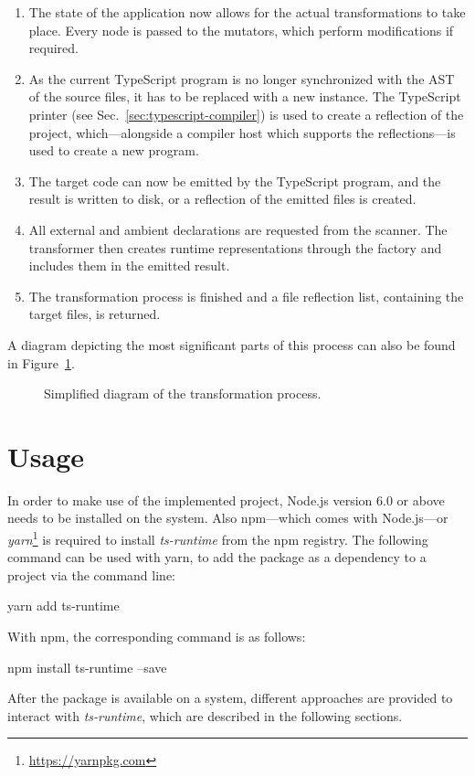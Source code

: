 \begin{enumerate}
  \item The state of the application now allows for the actual transformations to take place. Every node is passed to the mutators, which perform modifications if required.
  \item As the current TypeScript program is no longer synchronized with the AST of the source files, it has to be replaced with a new instance. The TypeScript printer (see Sec.~\ref{sec:typescript-compiler}) is used to create a reflection of the project, which---alongside a compiler host which supports the reflections---is used to create a new program.
  \item The target code can now be emitted by the TypeScript program, and the result is written to disk, or a reflection of the emitted files is created.
  \item All external and ambient declarations are requested from the scanner. The transformer then creates runtime representations through the factory and includes them in the emitted result.
  \item The transformation process is finished and a file reflection list, containing the target files, is returned.
\end{enumerate}
A diagram depicting the most significant parts of this process can also be found in Figure~\ref{fig:transformation-process}.
\begin{figure}
\centering

\caption{Simplified diagram of the transformation process.}
\label{fig:transformation-process}
\end{figure}

\section{Usage}
\label{sec:usage}

In order to make use of the implemented project, Node.js version 6.0 or above needs to be installed on the system. Also npm---which comes with Node.js---or \emph{yarn}\footnote{\url{https://yarnpkg.com}} is required to install \emph{ts-runtime} from the npm registry. The following command can be used with yarn, to add the package as a dependency to a project via the command line:
\begin{GenericCode}[numbers=none]
yarn add ts-runtime
\end{GenericCode}
With npm, the corresponding command is as follows:
\begin{GenericCode}[numbers=none]
npm install ts-runtime --save
\end{GenericCode}
After the package is available on a system, different approaches are provided to interact with \emph{ts-runtime}, which are described in the following sections.

